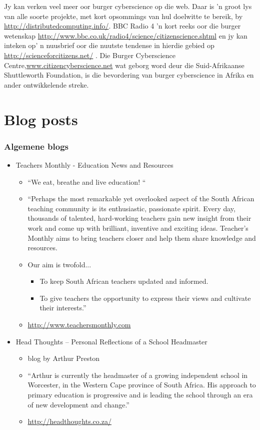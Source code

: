 Jy kan verken veel meer oor burger cyberscience op die web. Daar is 'n groot lys van alle soorte projekte, met kort opsommings van hul doelwitte te bereik, by \underline{http://distributedcomputing.info/}. BBC Radio 4 'n kort reeks oor die burger wetenskap \underline{http://www.bbc.co.uk/radio4/science/citizenscience.shtml}  en jy kan inteken op' n nuusbrief oor die nuutste tendense in hierdie gebied op \underline{http://scienceforcitizens.net/} . Die Burger Cyberscience Centre,\underline{www.citizencyberscience.net}  wat geborg word deur die Suid-Afrikaanse Shuttleworth Foundation, is die bevordering van burger cyberscience in Afrika en ander ontwikkelende streke. 


\section{Blog posts}
\subsubsection{Algemene blogs}
\begin{itemize}
\item Teachers Monthly - Education News and Resources
    \begin{itemize}[noitemsep]
      \item “We eat, breathe and live education! “
      \item “Perhaps the most remarkable yet overlooked aspect of the South African teaching community is its enthusiastic, passionate spirit. Every day, thousands of talented, hard-working teachers gain new insight from their work and come up with brilliant, inventive and exciting ideas. Teacher’s Monthly aims to bring teachers closer and help them share knowledge and resources.
      \item Our aim is twofold...
	    \begin{itemize}[noitemsep]
	      \item To keep South African teachers updated and informed.
	    \item To give teachers the opportunity to express their views and cultivate their interests.”
	    \end{itemize}
      \item \underline{http://www.teachersmonthly.com }
    \end{itemize}

\item Head Thoughts – Personal Reflections of a School Headmaster
    \begin{itemize}[noitemsep]
	\item blog by Arthur Preston
	\item “Arthur is currently the headmaster of a growing independent school in Worcester, in the Western Cape province of South Africa. His approach to primary education is progressive and is leading the school through an era of new development and change.”
\item \underline{http://headthoughts.co.za/ }
    \end{itemize}
\end{itemize}


